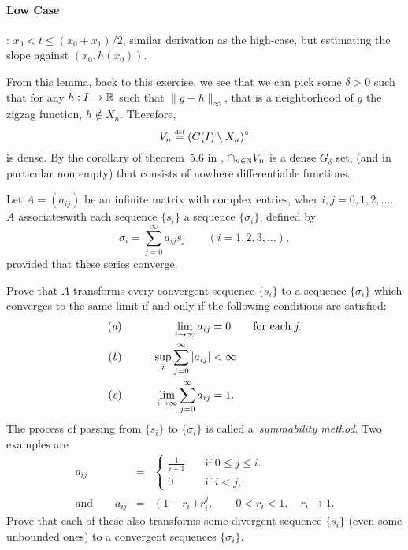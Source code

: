 \begin{enumerate}
\begin{thmproof}
\paragraph{Low Case}: \(x_0 < t \leq (x_0+x_1)/2\), similar derivation
as the high-case, but estimating the slope against \((x_0,h(x_0))\).
\end{thmproof}

From this lemma, back to this exercise, we see that we can pick 
some \(\delta>0\) such that for any \(h:I\to\mathbb{R}\) such that
\(\|g-h\|_\infty\), that is a neighborhood of $g$ the zigzag function, 
\(h\notin X_n\). 
Therefore, \[V_n \stackrel{\mbox{\upshape\tiny def}}{=} \left(C(I)\setminus X_n\right)^{\circ}\] is dense.
By the corollary of theorem~5.6 in \cite{RudinRCA87}, 
\(\cap_{n\in\mathbb{N}} V_n\) is a dense \(G_\delta\) set, 
(and in particular non empty) that consists of nowhere differentiable functions.


\begin{excopy}Let \(A=(a_{ij})\) be an infinite matrix with complex entries,
wher \(i,j=0,1,2,\ldots\).
$A$ associateswith each
sequence \(\{s_i\}\)
a sequence \(\{\sigma_i\}\), defined by
\[ \sigma_i = \sum_{j=0}^\infty a_{ij} s_j \qquad (i=1,2,3,\ldots), \]
provided that these series converge.

Prove that $A$ transforms every convergent sequence
\(\{s_i\}\)
to a sequence \(\{\sigma_i\}\) which converges to the same limit
if and only if the following conditions are satisfied:
\begin{alignat*}{2}
 (\textit{a}) & \qquad &\lim_{i\to\infty} a_{ij} &= 0\qquad \textrm{for each}\; j. \\
 (\textit{b}) & \qquad & \sup_i \sum_{j=0}^\infty |a_{ij}| &< \infty \\
 (\textit{c}) & \qquad & \lim_{i\to\infty} \sum_{j=0}^\infty a_{ij} &= 1.
\end{alignat*}
The process of passing from
\(\{s_i\}\) to \(\{\sigma_i\}\) is called
a~\emph{summability method}. Two examples are
\begin{eqnarray*}
a_{ij} &=&
   \left\{\begin{array}{ll}
          \frac{1}{i+1} & \quad \textrm{if}\; 0\leq j \leq i. \\
          0             & \quad \textrm{if}\; i < j,
          \end{array}\right. \\
\textrm{and}\qquad a_{ij} &=& (1-r_i)r_i^j, \qquad  0<r_i<1,\quad r_i\to 1.
\end{eqnarray*}
Prove that each of these also transforms some divergent sequence \(\{s_i\}\)
(even some unbounded ones) to a convergent sequences \(\{\sigma_i\}\).
\end{excopy}


\end{enumerate}
